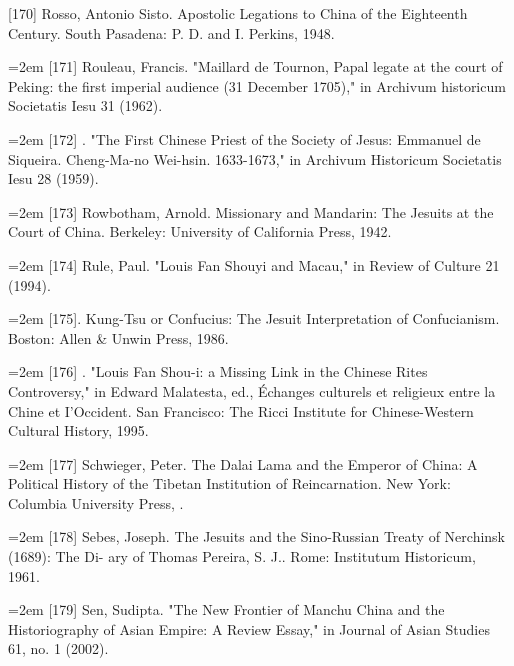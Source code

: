 [170] Rosso, Antonio Sisto. Apostolic Legations to China of the Eighteenth Century.%
\space%
South Pasadena: P. D. and I. Perkins, 1948.%
\par
\noindent\hangindent=2em
[171] Rouleau, Francis. "Maillard de Tournon, Papal legate at the court of Peking: the%
\space%
first imperial audience (31 December 1705)," in Archivum historicum Societatis%
\space%
Iesu 31 (1962).%
\par
\noindent\hangindent=2em
[172] . "The First Chinese Priest of the Society of Jesus: Emmanuel de Siqueira.%
\space%
Cheng-Ma-no Wei-hsin. 1633-1673," in Archivum Historicum Societatis Iesu 28%
(1959).%
\par
\noindent\hangindent=2em
[173] Rowbotham, Arnold. Missionary and Mandarin: The Jesuits at the Court of China.%
\space%
Berkeley: University of California Press, 1942.%
\par
\noindent\hangindent=2em
[174] Rule, Paul. "Louis Fan Shouyi and Macau," in Review of Culture 21 (1994).%
\par
\noindent\hangindent=2em
[175]. Kung-Tsu or Confucius: The Jesuit Interpretation of Confucianism. Boston:%
\space%
Allen \& Unwin Press, 1986.%
\par
\noindent\hangindent=2em
[176] . "Louis Fan Shou-i: a Missing Link in the Chinese Rites Controversy," in%
\space%
Edward Malatesta, ed., Échanges culturels et religieux entre la Chine et I'Occident.%
\space%
San Francisco: The Ricci Institute for Chinese-Western Cultural History, 1995.%
\par
\noindent\hangindent=2em
[177] Schwieger, Peter. The Dalai Lama and the Emperor of China: A Political History%
\space%
of the Tibetan Institution of Reincarnation. New York: Columbia University Press,%
.%
\par
\noindent\hangindent=2em
[178] Sebes, Joseph. The Jesuits and the Sino-Russian Treaty of Nerchinsk (1689): The Di-%
ary of Thomas Pereira, S. J.. Rome: Institutum Historicum, 1961.%
\par
\noindent\hangindent=2em
[179] Sen, Sudipta. "The New Frontier of Manchu China and the Historiography of%
\space%
Asian Empire: A Review Essay," in Journal of Asian Studies 61, no. 1 (2002).%
\par
